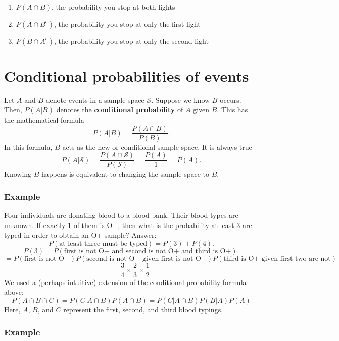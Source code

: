 \documentclass[
]{book}
\providecommand{\tightlist}{%
  \setlength{\itemsep}{0pt}\setlength{\parskip}{0pt}}
\begin{document}
\begin{enumerate}
\def\labelenumi{\alph{enumi}.}
\tightlist
\item
  \(P(A\cap B)\), the probability you stop at both lights
\item
  \(P(A \cap B^c)\), the probability you stop at only the first light
\item
  \(P(B \cap A^c)\), the probability you stop at only the second light
\end{enumerate}

\hypertarget{conditional-probabilities-of-events}{%
\chapter{Conditional probabilities of events}\label{conditional-probabilities-of-events}}

Let \(A\) and \(B\) denote events in a sample space \(\mathcal{S}\). Suppose we know \(B\) occurs. Then, \(P(A|B)\) denotes the \textbf{conditional probability} of \(A\) given \(B\). This has the mathematical formula
\[P(A|B) = \frac{P(A\cap B)}{P(B)}.\]
In this formula, \(B\) acts as the new or conditional sample space. It is always true
\[P(A|\mathcal{S}) = \frac{P(A\cap \mathcal{S})}{P(\mathcal{S})} = \frac{P(A)}{1} = P(A).\]
Knowing \(B\) happens is equivalent to changing the sample space to \(B\).

\hypertarget{example}{%
\subsection{Example}\label{example}}

Four individuals are donating blood to a blood bank. Their blood types are unknown. If exactly 1 of them is O+, then what is the probability at least 3 are typed in order to obtain an O+ sample?
Answer:
\[P(\text{at least three must be typed}) = P(3) + P(4).\]
\[P(3) = P(\text{first is not O+ and second is not O+ and third is O+}).\]
\[ = P(\text{first is not O+})P(\text{second is not O+ given first is not O+})P(\text{third is O+ given first two are not})\]
\[ = \frac{3}{4}\times \frac{2}{3}\times \frac{1}{2}.\]
We used a (perhaps intuitive) extension of the conditional probability formula above:
\[P(A\cap B\cap C) = P(C|A\cap B)P(A \cap B) = P(C|A\cap B)P(B|A)P(A)\]
Here, \(A\), \(B\), and \(C\) represent the first, second, and third blood typings.

\hypertarget{example-1}{%
\subsection{Example}\label{example-1}}
\end{document}
